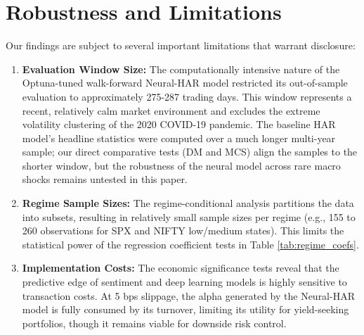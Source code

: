 \section{Robustness and Limitations}
\label{sec:robustness}
Our findings are subject to several important limitations that warrant disclosure:
\begin{enumerate}
    \item \textbf{Evaluation Window Size:} The computationally intensive nature of the Optuna-tuned walk-forward Neural-HAR model restricted its out-of-sample evaluation to approximately 275-287 trading days. This window represents a recent, relatively calm market environment and excludes the extreme volatility clustering of the 2020 COVID-19 pandemic. The baseline HAR model's headline statistics were computed over a much longer multi-year sample; our direct comparative tests (DM and MCS) align the samples to the shorter window, but the robustness of the neural model across rare macro shocks remains untested in this paper.
    \item \textbf{Regime Sample Sizes:} The regime-conditional analysis partitions the data into subsets, resulting in relatively small sample sizes per regime (e.g., 155 to 260 observations for SPX and NIFTY low/medium states). This limits the statistical power of the regression coefficient tests in Table \ref{tab:regime_coefs}.
    \item \textbf{Implementation Costs:} The economic significance tests reveal that the predictive edge of sentiment and deep learning models is highly sensitive to transaction costs. At 5 bps slippage, the alpha generated by the Neural-HAR model is fully consumed by its turnover, limiting its utility for yield-seeking portfolios, though it remains viable for downside risk control.
\end{enumerate}
